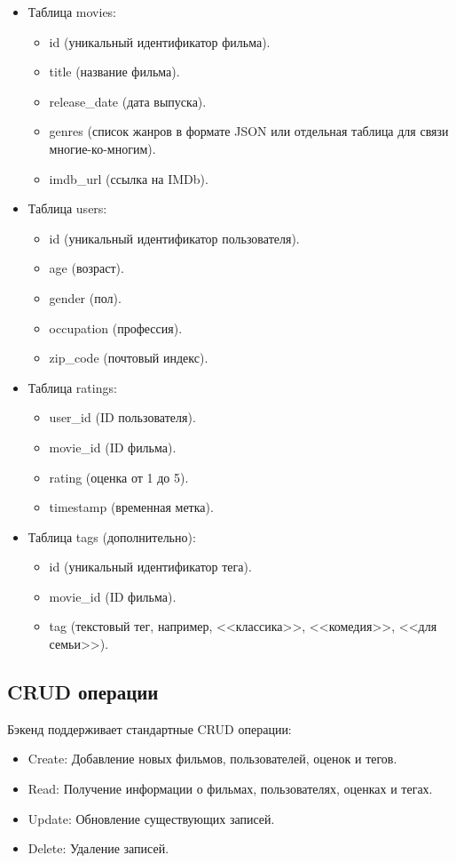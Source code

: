 \begin{itemize}
    \item Таблица movies:
    \begin{itemize}
        \item id (уникальный идентификатор фильма).
        \item title (название фильма).
        \item release\_date (дата выпуска).
        \item genres (список жанров в формате JSON или отдельная таблица для связи многие-ко-многим).
        \item imdb\_url (ссылка на IMDb).
    \end{itemize}
    \item Таблица users:
    \begin{itemize}
        \item id (уникальный идентификатор пользователя).
        \item age (возраст).
        \item gender (пол).
        \item occupation (профессия).
        \item zip\_code (почтовый индекс).
    \end{itemize}
    \item Таблица ratings:
    \begin{itemize}
        \item user\_id (ID пользователя).
        \item movie\_id (ID фильма).
        \item rating (оценка от 1 до 5).
        \item timestamp (временная метка).
    \end{itemize}
    \item Таблица tags (дополнительно):
    \begin{itemize}
        \item id (уникальный идентификатор тега).
        \item movie\_id (ID фильма).
        \item tag (текстовый тег, например, <<классика>>, <<комедия>>, <<для семьи>>).
    \end{itemize}
\end{itemize}

\subsection*{CRUD операции}
Бэкенд поддерживает стандартные CRUD операции:
\begin{itemize}
    \item Create: Добавление новых фильмов, пользователей, оценок и тегов.
    \item Read: Получение информации о фильмах, пользователях, оценках и тегах.
    \item Update: Обновление существующих записей.
    \item Delete: Удаление записей.
\end{itemize}

